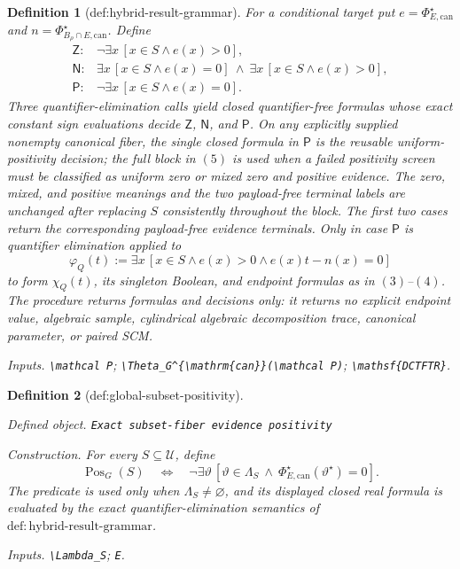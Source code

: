 \documentclass{article}
\newtheorem{definition}{Definition}
\begin{document}
\begin{definition}[def:hybrid-result-grammar]
For a conditional target put \(e=\Phi_{E,\mathrm{can}}^\star\) and \(n=\Phi_{B_\rho\cap E,\mathrm{can}}^\star\).  Define
\[
\begin{array}{ll}
\mathsf Z:&\neg\exists x\,[x\in S\wedge e(x)>0],\\
\mathsf N:&\exists x\,[x\in S\wedge e(x)=0]
\ \wedge\ \exists x\,[x\in S\wedge e(x)>0],\\
\mathsf P:&\neg\exists x\,[x\in S\wedge e(x)=0].
\end{array}
\tag{5}
\]
Three quantifier-elimination calls yield closed quantifier-free formulas whose exact constant sign evaluations decide \(\mathsf Z\), \(\mathsf N\), and \(\mathsf P\).  On any explicitly supplied nonempty canonical fiber, the single closed formula in \(\mathsf P\) is the reusable uniform-positivity decision; the full block in \((5)\) is used when a failed positivity screen must be classified as uniform zero or mixed zero and positive evidence.  The zero, mixed, and positive meanings and the two payload-free terminal labels are unchanged after replacing \(S\) consistently throughout the block.  The first two cases return the corresponding payload-free evidence terminals.  Only in case \(\mathsf P\) is quantifier elimination applied to
\[
\varphi_Q(t):=\exists x\,[x\in S\wedge e(x)>0\wedge e(x)t-n(x)=0]
\tag{6}
\]
to form \(\chi_Q(t)\), its singleton Boolean, and endpoint formulas as in \((3)\)--\((4)\).  The procedure returns formulas and decisions only: it returns no explicit endpoint value, algebraic sample, cylindrical algebraic decomposition trace, canonical parameter, or paired SCM.
\par\smallskip\noindent\emph{Inputs.} \texttt{\textbackslash{}\allowbreak{}mathcal P}; \texttt{\textbackslash{}\allowbreak{}Theta\_\allowbreak{}G\textasciicircum{}\{\textbackslash{}\allowbreak{}mathrm\{can\}\allowbreak{}\}\allowbreak{}(\textbackslash{}\allowbreak{}mathcal P)}; \texttt{\textbackslash{}\allowbreak{}mathsf\{DCTFTR\}\allowbreak{}}.
\end{definition}

\begin{definition}[def:global-subset-positivity]\label{def:global-subset-positivity}
\par\smallskip\noindent\emph{Defined object.} \texttt{Exact subset-\allowbreak{}fiber evidence positivity}
\par\smallskip\noindent\emph{Construction.} For every \(S\subseteq\mathcal U\), define
\[
\operatorname{Pos}_G(S)
\quad\Longleftrightarrow\quad
\neg\exists\vartheta\,
\left[\vartheta\in\Lambda_S\ \wedge\
\Phi_{E,\mathrm{can}}^\star(\vartheta^\star)=0\right].
\]
The predicate is used only when \(\Lambda_S\ne\varnothing\), and its displayed
closed real formula is evaluated by the exact quantifier-elimination semantics of
\(\mathrm{def:hybrid\text{-}result\text{-}grammar}\).
\par\smallskip\noindent\emph{Inputs.} \texttt{\textbackslash{}\allowbreak{}Lambda\_\allowbreak{}S}; \texttt{E}.
\end{definition}
\end{document}
